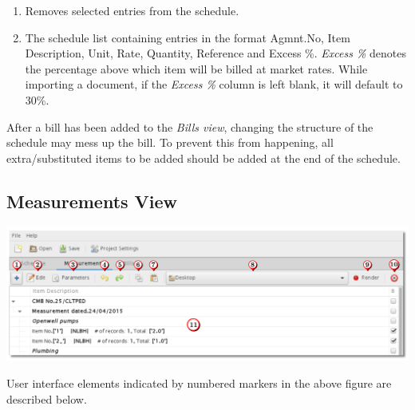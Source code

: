 \documentclass[twoside,a4paper]{refart}
\newenvironment{noteblock}[1]%
{\begin{mdframed}[topline=false,bottomline=false, rightline=false,
		linewidth=2pt, frametitle={#1}]}%
		{\end{mdframed}}
\begin{document}
\begin{enumerate}
\begin{noteblock}{Note:}
	 	\end{noteblock}
	 	\item Removes selected entries from the schedule.
	 	\item The schedule list containing entries in the format Agmnt.No, Item Description, Unit, Rate, Quantity, Reference and Excess \%. \emph{Excess \%} denotes the percentage above which item will be billed at market rates. \attention While importing a document, if the \emph{Excess \%} column is left blank, it will default to 30\%.
	 \end{enumerate}
	 
	 \begin{noteblock}{Note:}
	 	After a bill has been added to the \emph{Bills view}, changing the structure of the schedule may mess up the bill. To prevent this from happening, all extra/substituted items to be added should be added at the end of the schedule.
	 \end{noteblock}
	 
	 \subsection{Measurements View}
	 
	 \begin{maxipage}
	 	\includegraphics[width=1\linewidth]{screenshots/window_meas.png}
	 \end{maxipage}
	 
	 User interface elements indicated by numbered markers in the above figure are described below.
	 
\end{document}
